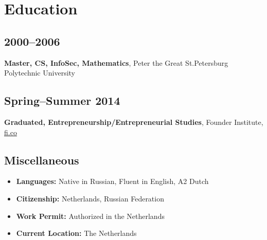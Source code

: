 \section*{Education}

\subsection*{2000--2006}
\textbf{Master, CS, InfoSec, Mathematics}, Peter the Great St.Petersburg Polytechnic University

\subsection*{Spring--Summer 2014}
\textbf{Graduated, Entrepreneurship/Entrepreneurial Studies}, Founder Institute, \href{https://fi.co}{\url{fi.co}}

\subsection*{Miscellaneous}
\begin{itemize}[noitemsep, nosep]
  \item \textbf{Languages:} Native in Russian, Fluent in English, A2 Dutch
  \item \textbf{Citizenship:} Netherlands, Russian Federation
  \item \textbf{Work Permit:} Authorized in the Netherlands
  \item \textbf{Current Location:} The Netherlands
\end{itemize}
